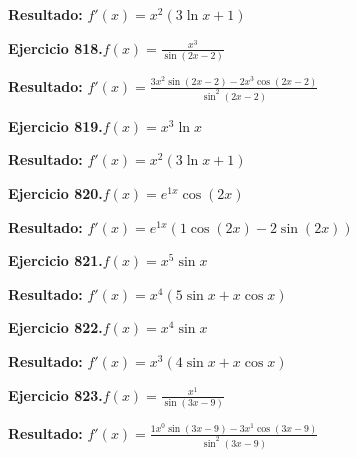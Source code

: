 \documentclass[10pt,a4paper]{article}
\begin{document}
\begin{solbox}
\textbf{Resultado:} \(\displaystyle f'(x) = x^{2}(3\ln x + 1)\)
\end{solbox}

\begin{ejbox}
\textbf{Ejercicio 818.}\quad $f(x) = \frac{x^{3}}{\sin(2x -2)}$
\end{ejbox}

\begin{solbox}
\textbf{Resultado:} \(\displaystyle f'(x) = \frac{3x^{2}\sin(2x -2) - 2x^{3}\cos(2x -2)}{\sin^2(2x -2)}\)
\end{solbox}

\begin{ejbox}
\textbf{Ejercicio 819.}\quad $f(x) = x^{3} \ln x$
\end{ejbox}

\begin{solbox}
\textbf{Resultado:} \(\displaystyle f'(x) = x^{2}(3\ln x + 1)\)
\end{solbox}

\newpage
\begin{ejbox}
\textbf{Ejercicio 820.}\quad $f(x) = e^{1x} \cos(2x)$
\end{ejbox}

\begin{solbox}
\textbf{Resultado:} \(\displaystyle f'(x) = e^{1x}(1\cos(2x) - 2\sin(2x))\)
\end{solbox}

\begin{ejbox}
\textbf{Ejercicio 821.}\quad $f(x) = x^{5} \sin x$
\end{ejbox}

\begin{solbox}
\textbf{Resultado:} \(\displaystyle f'(x) = x^{4}(5\sin x + x\cos x)\)
\end{solbox}

\begin{ejbox}
\textbf{Ejercicio 822.}\quad $f(x) = x^{4} \sin x$
\end{ejbox}

\begin{solbox}
\textbf{Resultado:} \(\displaystyle f'(x) = x^{3}(4\sin x + x\cos x)\)
\end{solbox}

\newpage
\begin{ejbox}
\textbf{Ejercicio 823.}\quad $f(x) = \frac{x^{1}}{\sin(3x -9)}$
\end{ejbox}

\begin{solbox}
\textbf{Resultado:} \(\displaystyle f'(x) = \frac{1x^{0}\sin(3x -9) - 3x^{1}\cos(3x -9)}{\sin^2(3x -9)}\)
\end{solbox}
\end{document}
